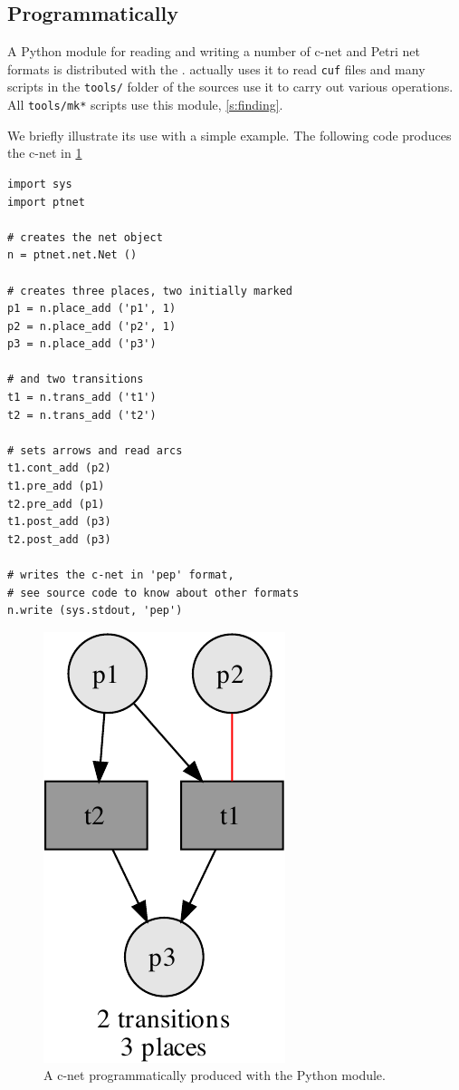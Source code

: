 \documentclass[a4paper]{refart}
\begin{document}
\subsection{Programmatically}%
\label{s:program}

A Python module for reading and writing a number of c-net and Petri net
formats is distributed with the \cunft{}.
\cna actually uses it to read \verb!cuf! files and many scripts in the
\verb!tools/! folder of the sources use it to carry out various operations.
All \verb!tools/mk*! scripts use this module, \cf \cref{s:finding}.

We briefly illustrate its use with a simple example.  The following code
produces the c-net in \cref{f:ptnet}

\begin{verbatim}
import sys
import ptnet

# creates the net object
n = ptnet.net.Net ()

# creates three places, two initially marked
p1 = n.place_add ('p1', 1)
p2 = n.place_add ('p2', 1)
p3 = n.place_add ('p3')

# and two transitions
t1 = n.trans_add ('t1')
t2 = n.trans_add ('t2')

# sets arrows and read arcs
t1.cont_add (p2)
t1.pre_add (p1)
t2.pre_add (p1)
t1.post_add (p3)
t2.post_add (p3)

# writes the c-net in 'pep' format,
# see source code to know about other formats
n.write (sys.stdout, 'pep')
\end{verbatim}

\begin{figure}[bth]
\centering
\includegraphics[scale=0.5]{fig/ptnet.pdf}
\caption{A c-net programmatically produced with the  Python
module.}
\label{f:ptnet}
\end{figure}




\end{document}
